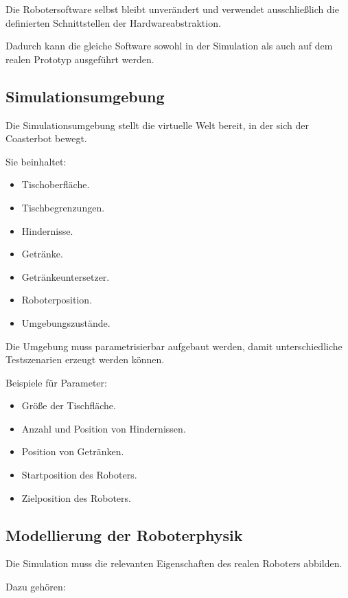 Die Robotersoftware selbst bleibt unverändert und verwendet
ausschließlich die definierten Schnittstellen der Hardwareabstraktion.

Dadurch kann die gleiche Software sowohl in der Simulation als auch auf
dem realen Prototyp ausgeführt werden.

\subsection{Simulationsumgebung}\label{simulationsumgebung}

Die Simulationsumgebung stellt die virtuelle Welt bereit, in der sich
der Coasterbot bewegt.

Sie beinhaltet:

\begin{itemize}
\tightlist
\item
  Tischoberfläche.
\item
  Tischbegrenzungen.
\item
  Hindernisse.
\item
  Getränke.
\item
  Getränkeuntersetzer.
\item
  Roboterposition.
\item
  Umgebungszustände.
\end{itemize}

Die Umgebung muss parametrisierbar aufgebaut werden, damit
unterschiedliche Testszenarien erzeugt werden können.

Beispiele für Parameter:

\begin{itemize}
\tightlist
\item
  Größe der Tischfläche.
\item
  Anzahl und Position von Hindernissen.
\item
  Position von Getränken.
\item
  Startposition des Roboters.
\item
  Zielposition des Roboters.
\end{itemize}

\subsection{Modellierung der
Roboterphysik}\label{modellierung-der-roboterphysik}

Die Simulation muss die relevanten Eigenschaften des realen Roboters
abbilden.

Dazu gehören:

